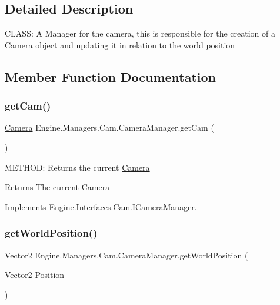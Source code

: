 \subsection{Detailed Description}
C\+L\+A\+SS\+: A Manager for the camera, this is responsible for the creation of a \hyperlink{a00490}{Camera} object and updating it in relation to the world position 



\subsection{Member Function Documentation}
\mbox{\label{a00494_a949b09e5c57971945c3ccb638f73765d}} 
\subsubsection{\texorpdfstring{get\+Cam()}{getCam()}}
{\footnotesize\ttfamily \hyperlink{a00490}{Camera} Engine.\+Managers.\+Cam.\+Camera\+Manager.\+get\+Cam (\begin{DoxyParamCaption}{ }\end{DoxyParamCaption})\hspace{0.3cm}{\ttfamily [inline]}}



M\+E\+T\+H\+OD\+: Returns the current \hyperlink{a00490}{Camera} 

\begin{DoxyReturn}{Returns}
The current \hyperlink{a00490}{Camera}
\end{DoxyReturn}


Implements \hyperlink{a00422_a91fc1dab51b36fd8955451ac00fd2819}{Engine.\+Interfaces.\+Cam.\+I\+Camera\+Manager}.

\mbox{\label{a00494_a538af3b5745f1f51e3da217d5c971791}} 
\subsubsection{\texorpdfstring{get\+World\+Position()}{getWorldPosition()}}
{\footnotesize\ttfamily Vector2 Engine.\+Managers.\+Cam.\+Camera\+Manager.\+get\+World\+Position (\begin{DoxyParamCaption}\item[{Vector2}]{Position }\end{DoxyParamCaption})\hspace{0.3cm}{\ttfamily [inline]}}



